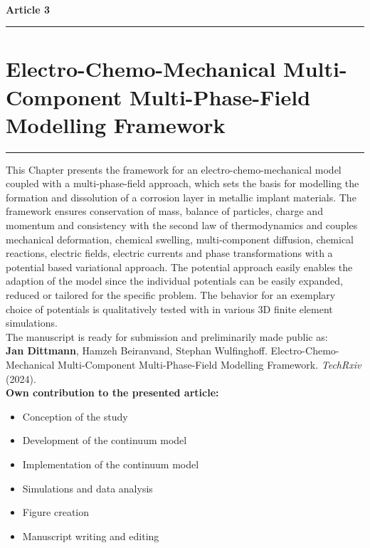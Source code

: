 \ \vspace{1cm} \\
{\Large \bf Article 3}
\normalsize
\vspace{0.3cm}
\hrule
\section*{\Large \centering Electro-Chemo-Mechanical Multi-Component Multi-Phase-Field Modelling Framework}
\hrule
\vspace{1.5cm}

This Chapter presents the framework for an electro-chemo-mechanical model coupled with a multi-phase-field approach, which sets the basis for modelling the formation and dissolution of a corrosion layer in metallic implant materials. The framework ensures conservation of mass, balance of particles, charge and momentum and consistency with the second law of thermodynamics and couples mechanical deformation, chemical swelling, multi-component diffusion, chemical reactions, electric fields, electric currents and phase transformations with a potential based variational approach. The potential approach easily enables the adaption of the model since the individual potentials can be easily expanded, reduced or tailored for the specific problem. The behavior for an exemplary choice of potentials is qualitatively tested with in various 3D finite element simulations.  \\

The manuscript is ready for submission and preliminarily made public as: \\

\textbf{Jan Dittmann}, Hamzeh Beiranvand, Stephan Wulfinghoff. Electro-Chemo-Mechanical Multi-Component Multi-Phase-Field Modelling Framework. \textit{TechRxiv} (2024). \\

\textbf{Own contribution to the presented article:}
\begin{itemize}
\item Conception of the study
\item Development of the continuum model
\item Implementation of the continuum model
\item Simulations and data analysis
\item Figure creation 
\item Manuscript writing and editing
\end{itemize}

